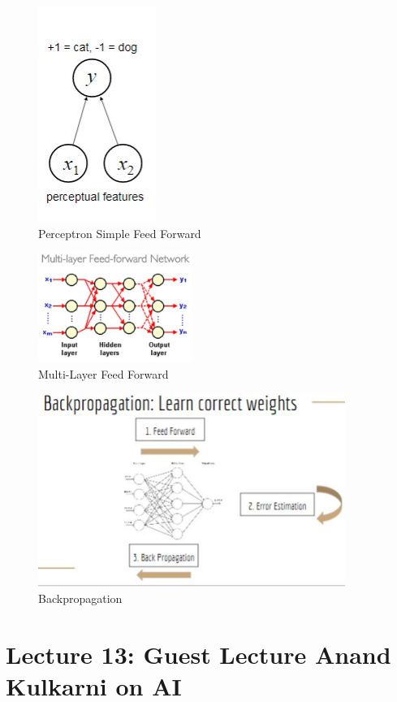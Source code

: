 \documentclass{article}
\begin{document}
\begin{figure}[htp]
\centering
\includegraphics{images/perceptron.JPG}
\caption{Perceptron Simple Feed Forward}
\label{fig: Perceptron}
\end{figure}


\begin{figure}[htp]
\centering
\includegraphics[width=5cm]{images/multilayerfeedforward.JPG}
\caption{Multi-Layer Feed Forward}
\label{fig: MLFF}
\end{figure}

\begin{figure}[htp]
\centering
\includegraphics[width=10cm]{images/backprop.JPG}
\caption{Backpropagation}
\label{fig: back prop}
\end{figure}

\newpage
\section{Lecture 13: Guest Lecture Anand Kulkarni on AI}
\end{document}
